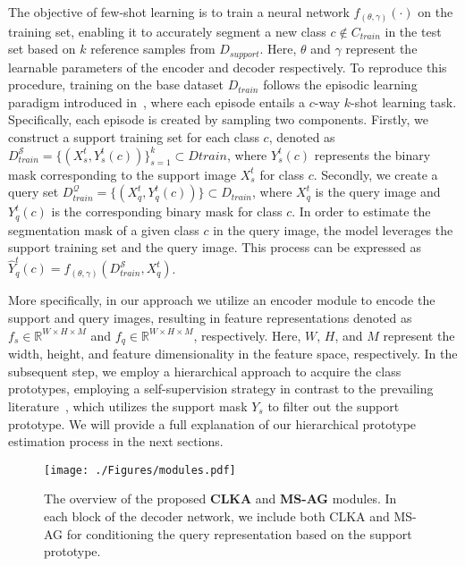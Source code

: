 \documentclass[runningheads]{llncs}
\begin{document}
The objective of few-shot learning is to train a neural network $f_{(\theta,\gamma)}(\cdot)$ on the training set, enabling it to accurately segment a new class $c \notin C_{train}$ in the test set based on $k$ reference samples from $D_{support}$. Here, $\theta$ and $\gamma$ represent the learnable parameters of the encoder and decoder respectively. 
To reproduce this procedure, training on the base dataset $D_{train}$ follows the episodic learning paradigm introduced in~\cite{vinyals2016matching}, where each episode entails a $c$-way $k$-shot learning task. Specifically, each episode is created by sampling two components. Firstly, we construct a support training set for each class $c$, denoted as $D_{train}^{\mathcal{S}}=\{{(X_s^t,Y_s^t(c))}\}_{s=1}^{k} \subset D{train}$, where $Y_s^t(c)$ represents the binary mask corresponding to the support image $X_s^t$ for class $c$. Secondly, we create a query set $D_{train}^{\mathcal{Q}}=\{{(X_q^t,Y_q^t(c))}\} \subset D_{train}$, where $X_q^t$ is the query image and $Y_q^t(c)$ is the corresponding binary mask for class $c$. In order to estimate the segmentation mask of a given class $c$ in the query image, the model leverages the support training set and the query image. This process can be expressed as $\hat Y_q^t(c)=f_{(\theta,\gamma)}(D_{train}^{\mathcal{S}},X_q^t)$.

More specifically, in our approach we utilize an encoder module to encode the support and query images, resulting in feature representations denoted as $f_s \in \mathbb{R}^{W \times H \times M}$ and $f_q \in \mathbb{R}^{W \times H \times M}$, respectively. Here, $W$, $H$, and $M$ represent the width, height, and feature dimensionality in the feature space, respectively. 
In the subsequent step, we employ a hierarchical approach to acquire the class prototypes, employing a self-supervision strategy in contrast to the prevailing literature~\cite{azad2021texture,hariharan2015hypercolumns}, which utilizes the support mask $Y_s$ to filter out the support prototype. We will provide a full explanation of our hierarchical prototype estimation process in the next sections.






\begin{figure}[!th]
    \centering
    \texttt{[image: ./Figures/modules.pdf]}
    \caption{The overview of the proposed \textbf{CLKA} and \textbf{MS-AG} modules. In each block of the decoder network, we include both CLKA and MS-AG for conditioning the query representation based on the support prototype.}
    \label{fig:decoder}
\end{figure} 
\end{document}
